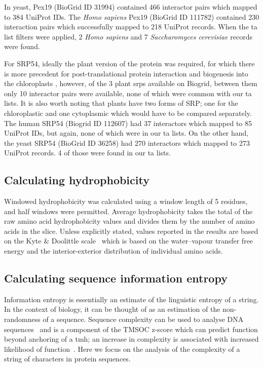 In yeast, Pex19 (BioGrid ID 31994) contained 466 interactor pairs which mapped to 384 UniProt IDs.
The \textit{Homo sapiens} Pex19 (BioGrid ID 111782) contained 230 interaction pairs which successfully mapped to 218 UniProt records.
When the \gls{ta} list filters were applied, 2 \textit{Homo sapiens} and 7 \textit{Saccharomyces cerevisiae} records were found.

For SRP54, ideally the plant version of the protein was required, for which there is more precedent for post\--translational protein interaction and biogenesis into the chloroplasts \cite{Abell2004}, however, of the 3 plant \gls{srp}s available on Biogrid, between them only 10 interactor pairs were available, none of which were common with our \gls{ta} lists.
It is also worth noting that plants have two forms of SRP; one for the chloroplastic and one cytoplasmic which would have to be compared separately.
The human SRP54 (Biogrid ID 112607) had 37 interactors which mapped to 85 UniProt IDs, but again, none of which were in our \gls{ta} lists.
On the other hand, the yeast SRP54 (BioGrid ID 36258) had 270 interactors which mapped to 273 UniProt records.
4 of those were found in our \gls{ta} lists.

\subsection{Calculating hydrophobicity}
Windowed hydrophobicity was calculated using a window length of 5 residues, and half windows were permitted.
Average hydrophobicity takes the total of the raw amino acid hydrophobicity values and divides them by the number of amino acids in the slice.
Unless explicitly stated, values reported in the results are based on the Kyte \& Doolittle scale~\cite{Kyte1982} which is based on the water\---vapour transfer free energy and the interior-exterior distribution of individual amino acids.

\subsection{Calculating sequence information entropy}
Information entropy is essentially an estimate of the linguistic entropy of a string.
In the context of biology, it can be thought of as an estimation of the non-randomness of a sequence.
Sequence complexity can be used to analyse DNA sequences~\cite{Pinho2013, Oliver1993, Troyanskaya2002} and is a component of the TMSOC z-score which can predict function beyond anchoring of a \gls{tmh}; an increase in complexity is associated with increased likelihood of function~\cite{Wong2011, Wong2012, Baker2017}.
Here we focus on the analysis of the complexity of a string of characters in protein sequences.


